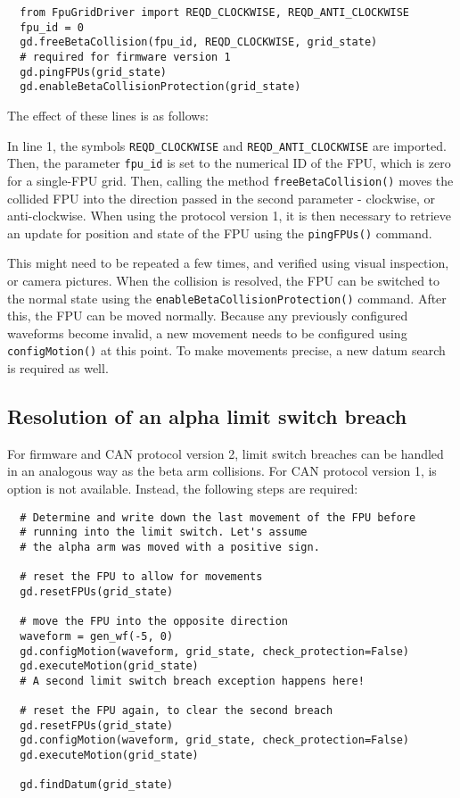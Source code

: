 \documentclass{scrartcl}[12pt,a4paper]
\begin{document}
\begin{verbatim}
  from FpuGridDriver import REQD_CLOCKWISE, REQD_ANTI_CLOCKWISE
  fpu_id = 0
  gd.freeBetaCollision(fpu_id, REQD_CLOCKWISE, grid_state)
  # required for firmware version 1
  gd.pingFPUs(grid_state)
  gd.enableBetaCollisionProtection(grid_state)
\end{verbatim}

The effect of these lines is as follows:

In line 1, the symbols \texttt{REQD\_CLOCKWISE} and
\texttt{REQD\_ANTI\_CLOCKWISE} are imported.  Then, the parameter
\texttt{fpu\_id} is set to the numerical ID of the FPU, which is zero
for a single-FPU grid. Then, calling the method
\texttt{freeBetaCollision()} moves the collided FPU into the direction
passed in the second parameter - clockwise, or anti-clockwise. When
using the protocol version 1, it is then necessary to retrieve an
update for position and state of the FPU using the \texttt{pingFPUs()}
command.

This might need to be repeated a few times, and verified using visual
inspection, or camera pictures. When the collision is resolved, the
FPU can be switched to the normal state using the
\texttt{enableBetaCollisionProtection()} command.  After this, the FPU
can be moved normally. Because any previously configured waveforms
become invalid, a new movement needs to be configured using
\texttt{configMotion()} at this point. To make movements precise, a
new datum search is required as well.

\subsection{Resolution of an alpha limit switch breach}

For firmware and CAN protocol  version 2, limit switch
breaches can be handled in an analogous way as the
beta arm collisions. For CAN protocol version 1,
is option is not available. Instead, the following
steps are required:

\begin{verbatim}
  # Determine and write down the last movement of the FPU before
  # running into the limit switch. Let's assume
  # the alpha arm was moved with a positive sign.

  # reset the FPU to allow for movements
  gd.resetFPUs(grid_state)

  # move the FPU into the opposite direction
  waveform = gen_wf(-5, 0)
  gd.configMotion(waveform, grid_state, check_protection=False)
  gd.executeMotion(grid_state)
  # A second limit switch breach exception happens here!

  # reset the FPU again, to clear the second breach
  gd.resetFPUs(grid_state)
  gd.configMotion(waveform, grid_state, check_protection=False)
  gd.executeMotion(grid_state)

  gd.findDatum(grid_state)
  
\end{verbatim}
  
\end{document}
